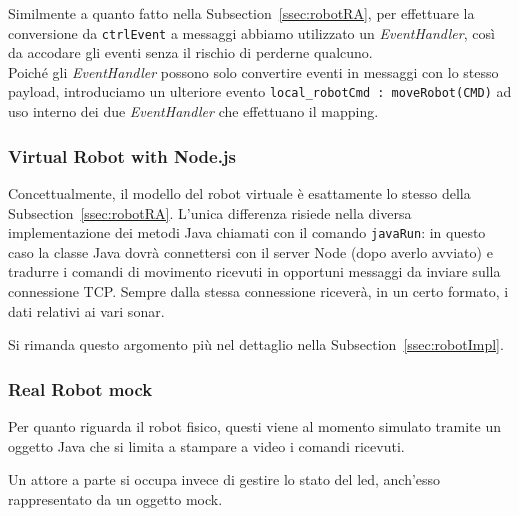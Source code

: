 \documentclass{../llncs}
\newcommand{\codescript}[1]{{\mbox{\small{\texttt{#1}}}}\xspace}
\newcommand{\xss}[1]{\subsectionname~\ref{ssec:#1}}
\newcommand{\subsectionname}{Subsection}
\begin{document}
Similmente a quanto fatto nella \xss{robotRA}, per effettuare la conversione da \codescript{ctrlEvent} a messaggi abbiamo utilizzato un \emph{EventHandler}, così da accodare gli eventi senza il rischio di perderne qualcuno.\\ %



Poiché gli \emph{EventHandler} possono solo convertire eventi in messaggi con lo stesso payload, introduciamo un ulteriore evento \codescript{local\_robotCmd : moveRobot(CMD)} ad uso interno dei due \emph{EventHandler} che effettuano il mapping.

%

\subsubsection{Virtual Robot with Node.js}
Concettualmente, il modello del robot virtuale è esattamente lo stesso della \xss{robotRA}. L'unica differenza risiede nella diversa implementazione dei metodi Java chiamati con il comando \codescript{javaRun}: in questo caso la classe Java dovrà connettersi con il server Node (dopo averlo avviato) e tradurre i comandi di movimento ricevuti in opportuni messaggi da inviare sulla connessione TCP. Sempre dalla stessa connessione riceverà, in un certo formato, i dati relativi ai vari sonar.

Si rimanda questo argomento più nel dettaglio nella \xss{robotImpl}.

\subsubsection{Real Robot mock}
Per quanto riguarda il robot fisico, questi viene al momento simulato tramite un oggetto Java che si limita a stampare a video i comandi ricevuti.

Un attore a parte si occupa invece di gestire lo stato del led, anch'esso rappresentato da un oggetto mock.\\
\end{document}
